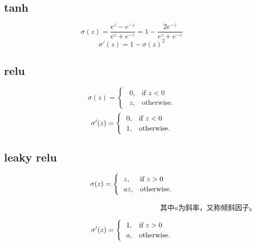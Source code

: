 \documentclass[UTF-8]{progbookcn}
\begin{document}
\subsection{tanh}
  \begin{equation}\label{E21}
    \sigma(z) = \frac{e^z-e^{-z}}{e^z+e^{-z}} = 1- \frac{2e^{-z}}{e^z + e^{-z}}
  \end{equation}
  \begin{equation}\label{E22}
    \sigma'(z) = 1-\sigma(z)^2
  \end{equation}


\subsection{relu\cite{Maas13rectifiernonlinearities}}
 \begin{equation}\label{E31}
    \sigma(z) = \begin{cases}
                   ~~0, & \mbox{if } z<0 \\
                   ~~z, & \mbox{otherwise}.
                 \end{cases}
 \end{equation}
 \begin{equation}\label{E32}
    \sigma'(z) = \begin{cases}
                   ~~0, & \mbox{if } z<0 \\
                   ~~1, & \mbox{otherwise}.
                 \end{cases}  \\
  \end{equation}


\subsection{leaky relu}
  \begin{equation}\label{E41}
    \sigma(z) = \begin{cases}
                   ~~z, & \mbox{if } z>0 \\
                   ~~az, & \mbox{otherwise}.
                 \end{cases}\\
  \end{equation} \centerline{~~~~~~~~~~~~~~~~~~~~~~~~~~~~~~~~~~~~~~~~~~~~其中$a$为斜率，又称倾斜因子。}
  \begin{equation}\label{E42}
    \sigma'(z) = \begin{cases}
                   ~~1, & \mbox{if } z>0 \\
                   ~~a, & \mbox{otherwise}.
                 \end{cases}\\
  \end{equation}
\end{document}
